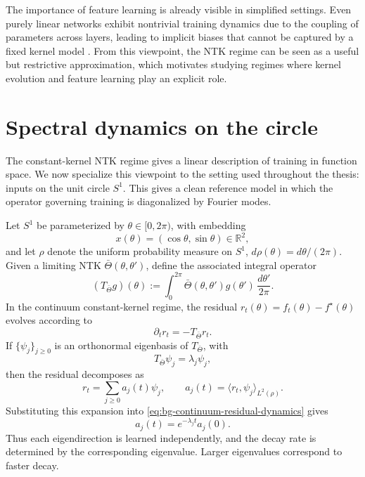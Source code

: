 The importance of feature learning is already visible in simplified settings.
Even purely linear networks exhibit nontrivial training dynamics due to the
coupling of parameters across layers, leading to implicit biases that cannot
be captured by a fixed kernel model
\citep{saxe2014exactsolutionsnonlineardynamics, tu2024mixeddynamicslinearnetworks}.
From this viewpoint, the NTK regime can be seen as a useful but restrictive
approximation, which motivates studying regimes where kernel evolution and
feature learning play an explicit role.


\section{Spectral dynamics on the circle}
\label{sec:background-spectral-dynamics-circle}

The constant-kernel NTK regime gives a linear description of training in
function space. We now specialize this viewpoint to the setting used throughout
the thesis: inputs on the unit circle \(S^1\). This gives a clean reference
model in which the operator governing training is diagonalized by Fourier modes.

Let \(S^1\) be parameterized by \(\theta \in [0,2\pi)\), with embedding
\[
	x(\theta) = (\cos\theta,\sin\theta) \in \mathbb R^2,
\]
and let \(\rho\) denote the uniform probability measure on \(S^1\),
\(d\rho(\theta)=d\theta/(2\pi)\). Given a limiting NTK
\(\bar\Theta(\theta,\theta')\), define the associated integral operator
\begin{equation}
	(T_{\bar\Theta}g)(\theta)
	:=
	\int_0^{2\pi}
	\bar\Theta(\theta,\theta')g(\theta')
	\,\frac{d\theta'}{2\pi}.
	\label{eq:bg-ntk-integral-operator}
\end{equation}
In the continuum constant-kernel regime, the residual
\(r_t(\theta)=f_t(\theta)-f^\star(\theta)\) evolves according to
\begin{equation}
	\partial_t r_t = -T_{\bar\Theta} r_t.
	\label{eq:bg-continuum-residual-dynamics}
\end{equation}
If \(\{\psi_j\}_{j\ge 0}\) is an orthonormal eigenbasis of
\(T_{\bar\Theta}\), with
\[
	T_{\bar\Theta}\psi_j=\lambda_j\psi_j,
\]
then the residual decomposes as
\[
	r_t = \sum_{j\ge 0} a_j(t)\psi_j,
	\qquad
	a_j(t)=\langle r_t,\psi_j\rangle_{L^2(\rho)}.
\]
Substituting this expansion into \eqref{eq:bg-continuum-residual-dynamics}
gives
\begin{equation}
	a_j(t)=e^{-\lambda_j t}a_j(0).
	\label{eq:bg-continuum-mode-decay}
\end{equation}
Thus each eigendirection is learned independently, and the decay rate is
determined by the corresponding eigenvalue. Larger eigenvalues correspond to
faster decay.

